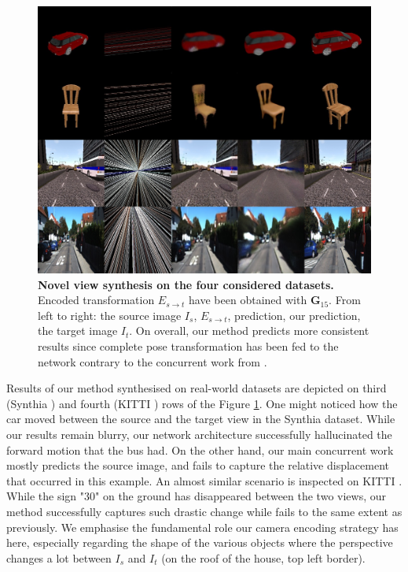 \begin{figure}[h!]
    \begin{center}
    \includegraphics[width=\textwidth]{images/epipolarnvs/resultsFinal_BMVC.jpg}
    \end{center}
     \caption{\textbf{Novel view synthesis on the four considered datasets.} Encoded transformation $E_{s\xrightarrow{}t}$ have been obtained with $\textbf{G}_{15}$. From left to right: the source image  $I_s$, $E_{s\xrightarrow{}t}$, \citep{kim2020novel} prediction, our prediction, the target image $I_t$. On overall, our method predicts more consistent results since complete pose transformation has been fed to the network contrary to the concurrent work from \citep{kim2020novel}. }
     \label{fig:res_all}
\end{figure}

Results of our method synthesised on real-world datasets are depicted on third (Synthia \citep{ros2016synthia}) and fourth (KITTI \citep{geiger2012we}) rows of the Figure \ref{fig:res_all}. One might noticed how the car moved between the source and the target view in the Synthia \citep{ros2016synthia} dataset. While our results remain blurry, our network architecture successfully hallucinated the forward motion that the bus had. On the other hand, our main concurrent work mostly predicts the source image, and fails to capture the relative displacement that occurred in this example. An almost similar scenario is inspected on KITTI \citep{geiger2012we}. While the sign "30" on the ground has disappeared between the two views, our method successfully captures such drastic change while \citep{kim2020novel} fails to the same extent as previously. We emphasise the fundamental role our camera encoding strategy has here, especially regarding the shape of the various objects where the perspective changes a lot between $I_s$ and $I_t$ (on the roof of the house, top left border). \newline


